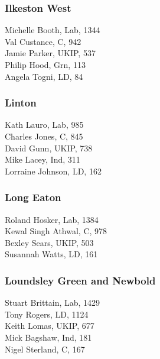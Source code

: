 \documentclass[a4paper,openany,10pt]{book}
\begin{document}
\subsubsection*{Ilkeston West}



Michelle Booth, Lab, 1344\\
Val Custance, C, 942\\
Jamie Parker, UKIP, 537\\
Philip Hood, Grn, 113\\
Angela Togni, LD, 84\\


\subsubsection*{Linton}



Kath Lauro, Lab, 985\\
Charles Jones, C, 845\\
David Gunn, UKIP, 738\\
Mike Lacey, Ind, 311\\
Lorraine Johnson, LD, 162\\


\subsubsection*{Long Eaton}



Roland Hosker, Lab, 1384\\
Kewal Singh Athwal, C, 978\\
Bexley Sears, UKIP, 503\\
Susannah Watts, LD, 161\\


\subsubsection*{Loundsley Green and Newbold}



Stuart Brittain, Lab, 1429\\
Tony Rogers, LD, 1124\\
Keith Lomas, UKIP, 677\\
Mick Bagshaw, Ind, 181\\
Nigel Sterland, C, 167\\
\end{document}

